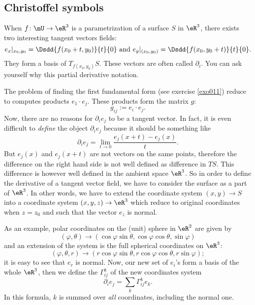 %
   \subsection{Christoffel symbols}
%

When $f\colon \mU\to \eR^3$ is a parametrization of a surface $S$ in $\eR^3$, there exists two interesting tangent vectors fields:
\begin{equation} \label{eq_basvecto}
 e_x|_{x_0,y_0}= \Dsdd{ f(x_0+t,y_0) }{t}{0}\text{ and } e_y|_{(x_0,y_0)}=\Dsdd{ f(x_0,y_0+t) }{t}{0}.
\end{equation}
They form a basis of $T_{f(x_0,y_0)}S$. These vectors are often called $\partial_i$. You can ask yourself why this partial derivative notation.

The problem of finding the first fundamental  form (see exercise \ref{exo011}) reduce to computes products $e_1\cdot e_j$. These products form the matrix $g$:
\[ 
  g_{ij}:=e_i\cdot e_j.
\]
 Now, there are no reasons for $\partial_i e_j$ to be a tangent vector. In fact, it is even difficult to \emph{define} the object $\partial_i e_j$ because it should be something like
\[ 
  \partial_i e_j=\lim_{t\to 0}\frac{ e_j(x+t)-e_j(x) }{ t }.
\]
But $e_j(x)$ and $e_j(x+t)$ are not vectors on the same points, therefore the difference on the right hand side is not well defined as difference in $TS$. This difference is however well defined in the ambient space $\eR^3$. So in order to define the derivative of a tangent vector field, we have to consider the surface as a part of $\eR^3$. In other words, we have to extend the coordinate system $(x,y)\to S$ into a coordinate system $(x,y,z)\to\eR^3$ which reduce to original coordinates when $z=z_0$ and such that the vector $e_z$ is normal.

As an example, polar coordinates on the (unit) sphere in $\eR^2$ are given by 
\[ 
  (\varphi,\theta)\to (\cos\varphi\sin\theta,\cos\varphi\cos\theta,\sin\varphi)
\]
and an extension of the system is the full spherical coordinates on $\eR^3$:
\[ 
   (\varphi,\theta,r)\to (r\cos\varphi\sin\theta,r\cos\varphi\cos\theta,r\sin\varphi);
\]
it is easy to see that $e_r$ is normal. Now, our new set of $e_i$'s form a basis of the whole $\eR^3$, then we define the  $\Gamma_{ij}^{k}$ of the new coordinates system
\begin{equation} \label{eq_def_sch}
\partial_ie_j=\sum_k\Gamma_{ij}^{k}e_k.
\end{equation}
In this formula, $k$ is summed over \emph{all} coordinates, including the normal one. 

